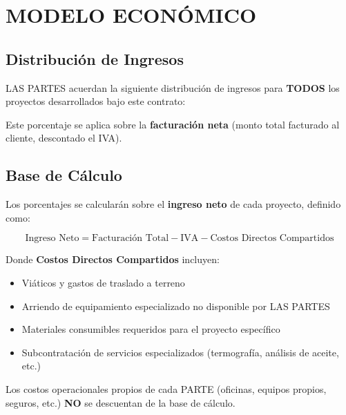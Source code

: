 \documentclass[11pt,letterpaper]{article}
\begin{document}
\section{MODELO ECONÓMICO}

\subsection{Distribución de Ingresos}

LAS PARTES acuerdan la siguiente distribución de ingresos para \textbf{TODOS} los proyectos desarrollados bajo este contrato:

\begin{center}
\end{center}

\vspace{0.3cm}

Este porcentaje se aplica sobre la \textbf{facturación neta} (monto total facturado al cliente, descontado el IVA).

\subsection{Base de Cálculo}

Los porcentajes se calcularán sobre el \textbf{ingreso neto} de cada proyecto, definido como:

\begin{equation}
\text{Ingreso Neto} = \text{Facturación Total} - \text{IVA} - \text{Costos Directos Compartidos}
\end{equation}

Donde \textbf{Costos Directos Compartidos} incluyen:
\begin{itemize}
    \item Viáticos y gastos de traslado a terreno
    \item Arriendo de equipamiento especializado no disponible por LAS PARTES
    \item Materiales consumibles requeridos para el proyecto específico
    \item Subcontratación de servicios especializados (termografía, análisis de aceite, etc.)
\end{itemize}

Los costos operacionales propios de cada PARTE (oficinas, equipos propios, seguros, etc.) \textbf{NO} se descuentan de la base de cálculo.
\end{document}
